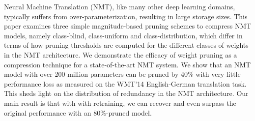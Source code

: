 Neural Machine Translation (NMT), like many other deep learning domains, typically suffers from over-parameterization, resulting in large storage sizes. This paper examines three simple magnitude-based pruning schemes to compress NMT models, namely class-blind, class-uniform and class-distribution, which differ in terms of how pruning thresholds are computed for the different classes of weights in the NMT architecture. We demonstrate the efficacy of weight pruning as a compression technique for a state-of-the-art NMT system. We show that an NMT model with over 200 million parameters can be pruned by 40\% with very little performance loss as measured on the WMT'14 English-German translation task. This sheds light on the distribution of redundancy in the NMT architecture. Our main result is that with with retraining, we can recover and even surpass the original performance with an 80\%-pruned model.
